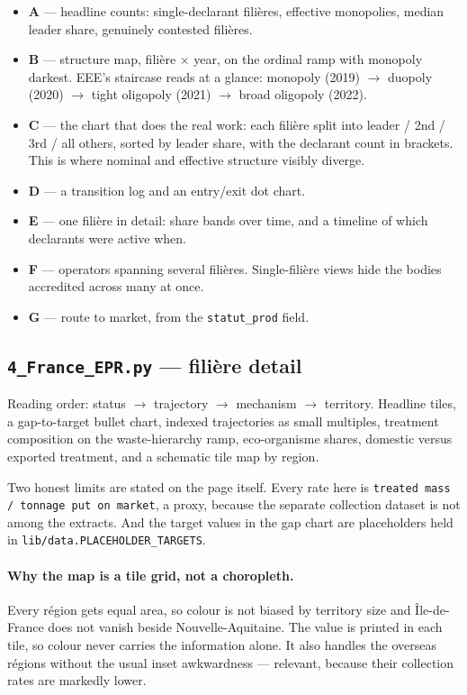 \documentclass[11pt,a4paper]{article}
\newcommand{\file}[1]{\texttt{#1}}
\begin{document}
\begin{itemize}
  \item \textbf{A} --- headline counts: single-declarant filières, effective
        monopolies, median leader share, genuinely contested filières.
  \item \textbf{B} --- structure map, filière $\times$ year, on the ordinal ramp
        with monopoly darkest. EEE's staircase reads at a glance: monopoly
        (2019) $\rightarrow$ duopoly (2020) $\rightarrow$ tight oligopoly (2021)
        $\rightarrow$ broad oligopoly (2022).
  \item \textbf{C} --- the chart that does the real work: each filière split
        into leader / 2nd / 3rd / all others, sorted by leader share, with the
        declarant count in brackets. This is where nominal and effective
        structure visibly diverge.
  \item \textbf{D} --- a transition log and an entry/exit dot chart.
  \item \textbf{E} --- one filière in detail: share bands over time, and a
        timeline of which declarants were active when.
  \item \textbf{F} --- operators spanning several filières. Single-filière views
        hide the bodies accredited across many at once.
  \item \textbf{G} --- route to market, from the \file{statut\_prod} field.
\end{itemize}

\subsection{\file{4\_France\_EPR.py} --- filière detail}

Reading order: status $\rightarrow$ trajectory $\rightarrow$ mechanism
$\rightarrow$ territory. Headline tiles, a gap-to-target bullet chart, indexed
trajectories as small multiples, treatment composition on the waste-hierarchy
ramp, eco-organisme shares, domestic versus exported treatment, and a schematic
tile map by region.

Two honest limits are stated on the page itself. Every rate here is
\file{treated mass / tonnage put on market}, a proxy, because the separate
collection dataset is not among the extracts. And the target values in the
gap chart are placeholders held in \file{lib/data.PLACEHOLDER\_TARGETS}.

\paragraph{Why the map is a tile grid, not a choropleth.} Every région gets
equal area, so colour is not biased by territory size and Île-de-France does not
vanish beside Nouvelle-Aquitaine. The value is printed in each tile, so colour
never carries the information alone. It also handles the overseas régions
without the usual inset awkwardness --- relevant, because their collection rates
are markedly lower.
\end{document}

